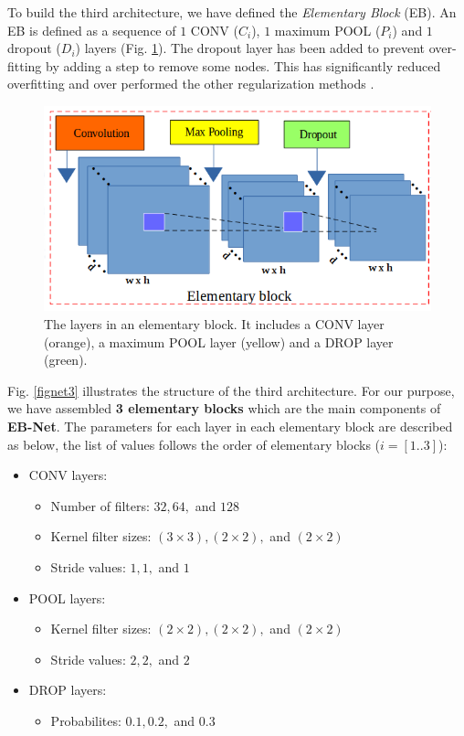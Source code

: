 \documentclass[review]{elsarticle}
\begin{document}
To build the third architecture, we have defined the \textit{Elementary Block} (EB). An EB is defined as a sequence of $1$ CONV ($C_{i}$), $1$ maximum POOL ($P_i$) and $1$ dropout ($D_i$) layers (Fig. \ref{figelementary}). The dropout layer has been added to prevent over-fitting by adding a step to remove some nodes. This has significantly reduced overfitting and over performed the other regularization methods \cite{srivastava2014dropout}.

\begin{figure}[h]
	\centering
	\includegraphics[scale=0.3]{images/elementary_block}
	\caption{The layers in an elementary block. It includes a CONV layer (orange), a maximum POOL layer (yellow) and a DROP layer (green).}
	\label{figelementary}
\end{figure}

Fig. \ref{fignet3} illustrates the structure of the third architecture. For our purpose, we have assembled \textbf{3 elementary blocks} which are the main components of \textbf{EB-Net}. The parameters for each layer in each elementary block are described as below, the list of values follows the order of elementary blocks ($i = [1..3]$):
\begin{itemize}
	\item CONV layers:
	\begin{itemize}
		\item Number of filters: $32, 64, $ and $128$
		\item Kernel filter sizes: $(3 \times 3), (2 \times 2), $ and $(2 \times 2)$
		\item Stride values: $1, 1, $ and $1$ 
	\end{itemize}
	\item POOL layers:
		\begin{itemize}
			\item Kernel filter sizes: $(2 \times 2), (2 \times 2), $ and $(2 \times 2)$
			\item Stride values: $2, 2, $ and $2$
		\end{itemize}
	\item DROP layers:
		\begin{itemize}
			\item Probabilites: $0.1, 0.2, $ and $0.3$
		\end{itemize}
\end{itemize}
\end{document}

